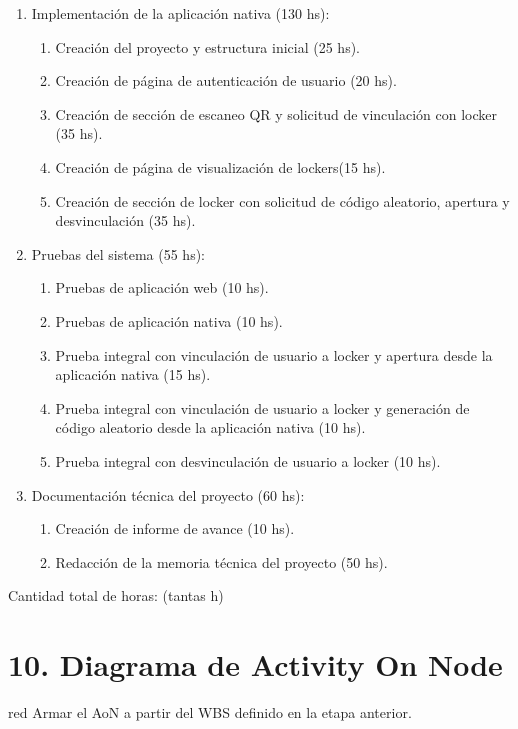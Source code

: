 \documentclass[
11pt, %
]{charter}
\begin{document}
\begin{enumerate}
\item Implementación de la aplicación nativa (130 hs):
	\begin{enumerate}
	\item Creación del proyecto y estructura inicial (25 hs).
	\item Creación de página de autenticación de usuario (20 hs).
	\item Creación de sección de escaneo QR y solicitud de vinculación con locker (35 hs).	
	\item Creación de página de visualización de lockers(15 hs).
	\item Creación de sección de locker con solicitud de código aleatorio, apertura y desvinculación (35 hs).
	\end{enumerate}	
	
\item Pruebas del sistema (55 hs):
	\begin{enumerate}
	\item Pruebas de aplicación web (10 hs).
	\item Pruebas de aplicación nativa (10 hs).
	\item Prueba integral con vinculación de usuario a locker y apertura desde la aplicación nativa (15 hs).	
	\item Prueba integral con vinculación de usuario a locker y generación de código aleatorio desde la aplicación nativa (10 hs).	
	\item Prueba integral con desvinculación de usuario a locker (10 hs).	
	\end{enumerate}	
	
\item Documentación técnica del proyecto (60 hs):
	\begin{enumerate}
	\item Creación de informe de avance (10 hs).
	\item Redacción de la memoria técnica del proyecto (50 hs).
	\end{enumerate}	
\end{enumerate}

Cantidad total de horas: (tantas h)

\section{10. Diagrama de Activity On Node}
\label{sec:AoN}

\begin{consigna}{red}
Armar el AoN a partir del WBS definido en la etapa anterior. 



\end{consigna}
\end{document}
